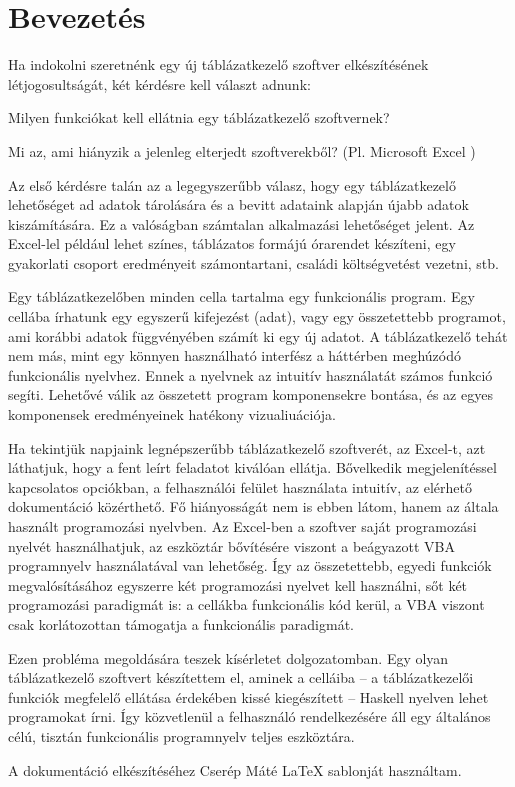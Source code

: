 \chapter{Bevezetés} %
\label{ch:intro}

Ha indokolni szeretnénk egy új táblázatkezelő szoftver elkészítésének létjogosultságát, két kérdésre kell választ adnunk:
\begin{compactenum}
	\item Milyen funkciókat kell ellátnia egy táblázatkezelő szoftvernek?
	\item Mi az, ami hiányzik a jelenleg elterjedt szoftverekből? (Pl. Microsoft Excel \cite{excel})
\end{compactenum}

Az első kérdésre talán az a legegyszerűbb válasz, hogy egy táblázatkezelő lehetőséget ad adatok tárolására és a bevitt adataink alapján újabb adatok kiszámítására. Ez a valóságban számtalan alkalmazási lehetőséget jelent. Az Excel-lel például lehet színes, táblázatos formájú órarendet készíteni, egy gyakorlati csoport eredményeit számontartani, családi költségvetést vezetni, stb. 

Egy táblázatkezelőben minden cella tartalma egy funkcionális program. Egy cellába írhatunk egy egyszerű kifejezést (adat), vagy egy összetettebb programot, ami korábbi adatok függvényében számít ki egy új adatot. A táblázatkezelő tehát nem más, mint egy könnyen használható interfész a háttérben meghúzódó funkcionális nyelvhez. Ennek a nyelvnek az intuitív használatát számos funkció segíti. Lehetővé válik az összetett program komponensekre bontása, és az egyes komponensek eredményeinek hatékony vizualiuációja.

Ha tekintjük napjaink legnépszerűbb táblázatkezelő szoftverét, az Excel-t, azt láthatjuk, hogy a fent leírt feladatot kiválóan ellátja. Bővelkedik megjelenítéssel kapcsolatos opciókban, a felhasználói felület használata intuitív, az elérhető dokumentáció közérthető. Fő hiányosságát nem is ebben látom, hanem az általa használt programozási nyelvben. Az Excel-ben a szoftver saját programozási nyelvét használhatjuk, az eszköztár bővítésére viszont a beágyazott VBA \cite{vba_excel} programnyelv használatával van lehetőség. Így az összetettebb, egyedi funkciók megvalósításához egyszerre két programozási nyelvet kell használni, sőt két programozási paradigmát is: a cellákba funkcionális kód kerül, a VBA viszont csak korlátozottan támogatja a funkcionális paradigmát. 

Ezen probléma megoldására teszek kísérletet dolgozatomban. Egy olyan táblázatkezelő szoftvert készítettem el, aminek a celláiba -- a táblázatkezelői funkciók megfelelő ellátása érdekében kissé kiegészített -- Haskell \cite{haskell_report} nyelven lehet programokat írni. Így közvetlenül a felhasználó rendelkezésére áll egy általános célú, tisztán funkcionális programnyelv teljes eszköztára.

A dokumentáció elkészítéséhez Cserép Máté LaTeX sablonját \cite{mcserep} használtam. 	